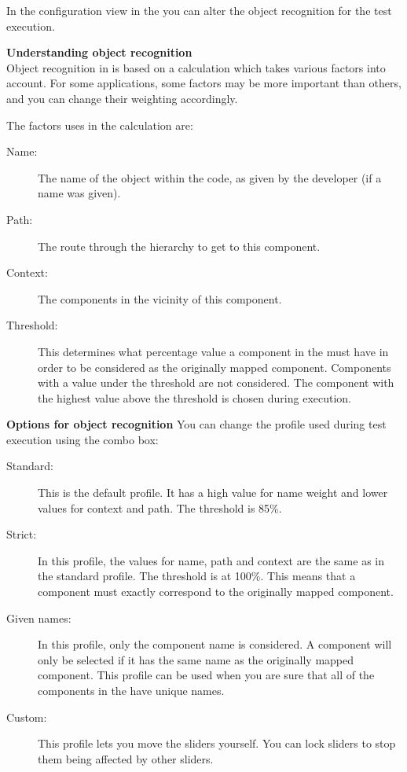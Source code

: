 \label{TasksOMConfiguration}

In the configuration view in the \gdomeditor{} you can alter the object recognition for the test execution. 


\textbf{Understanding object recognition}\\
Object recognition in \app{} is based on a calculation which takes various factors into account. For some applications, some factors may be more important than others, and you can change their weighting accordingly. 

The factors \app{} uses in the calculation are:

\begin{description}
\item [Name:]{The name of the object within the \gdaut{} code, as given by the developer (if a name was given). }
\item [Path:]{The route through the \gdaut{} hierarchy to get to this component.}
\item [Context:]{The components in the vicinity of this component.}
\item[Threshold:]{This determines what percentage value a component in the \gdaut{} must have in order to be considered as the originally mapped component. Components with a value under the threshold are not considered. The component with the highest value above the threshold is chosen during execution.}
\end{description}

\textbf{Options for object recognition}
You can change the profile used during test execution using the combo box:

\begin{description}
\item[Standard:]{This is the default profile. It has a high value for name weight and lower values for context and path. The threshold is 85\%.}
\item[Strict:]{In this profile, the values for name, path and context are the same as in the standard profile. The threshold is at 100\%. This means that a component must exactly correspond to the originally mapped component.}
\item[Given names:]{In this profile, only the component name is considered. A component will only be selected if it has the same name as the originally mapped component. This profile can be used when you are sure that all of the components in the \gdaut{} have unique names.}
\item[Custom:]{This profile lets you move the sliders yourself. You can lock sliders to stop them being affected by other sliders.}
\end{description}

